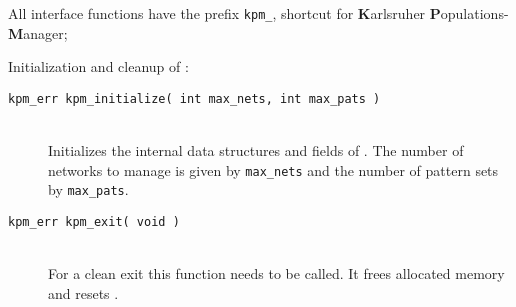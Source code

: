 All  \nepomuk interface functions have the prefix \verb+kpm_+,
shortcut for {\bf K}arlsruher {\bf P}opulations-{\bf M}anager;

Initialization and cleanup of \nepomuk:

\begin{description}

  \item[\tt kpm\_err kpm\_initialize( int max\_nets, int max\_pats )]~\\
	Initializes the internal data structures and fields of \nepomuk.
        The number of networks to manage is given by \verb+max_nets+
	and the number of pattern sets by \verb+max_pats+.

  \item[\tt kpm\_err kpm\_exit( void )]~\\
	For a clean  exit this function needs to be called. It frees allocated
	memory and resets \nepomuk.

\end{description}

